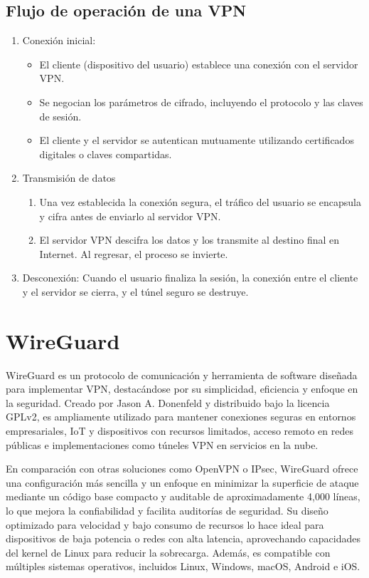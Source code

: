 \subsection{Flujo de operación de una VPN}
\begin{enumerate}
    \item Conexión inicial:
    \begin{itemize}
        \item El cliente (dispositivo del usuario) establece una conexión con el servidor VPN.
        \item Se negocian los parámetros de cifrado, incluyendo el protocolo y las claves de sesión.
        \item El cliente y el servidor se autentican mutuamente utilizando certificados digitales o claves compartidas.
    \end{itemize}

   \item Transmisión de datos
        \begin{enumerate}
            \item Una vez establecida la conexión segura, el tráfico del usuario se encapsula y cifra antes de enviarlo al servidor VPN.
            \item El servidor VPN descifra los datos y los transmite al destino final en Internet. Al regresar, el proceso se invierte.
        \end{enumerate}
    \item Desconexión: Cuando el usuario finaliza la sesión, la conexión entre el cliente y el servidor se cierra, y el túnel seguro se destruye.
\end{enumerate}

\section{WireGuard}
    WireGuard es un protocolo de comunicación y herramienta de software diseñada para implementar VPN, destacándose por su simplicidad, eficiencia y enfoque en la seguridad. Creado por Jason A. Donenfeld y distribuido bajo la licencia GPLv2, es ampliamente utilizado para mantener conexiones seguras en entornos empresariales, IoT y dispositivos con recursos limitados, acceso remoto en redes públicas e implementaciones como túneles VPN en servicios en la nube.  

    En comparación con otras soluciones como OpenVPN o IPsec, WireGuard ofrece una configuración más sencilla y un enfoque en minimizar la superficie de ataque mediante un código base compacto y auditable de aproximadamente 4,000 líneas, lo que mejora la confiabilidad y facilita auditorías de seguridad. Su diseño optimizado para velocidad y bajo consumo de recursos lo hace ideal para dispositivos de baja potencia o redes con alta latencia, aprovechando capacidades del kernel de Linux para reducir la sobrecarga. Además, es compatible con múltiples sistemas operativos, incluidos Linux, Windows, macOS, Android e iOS.  

